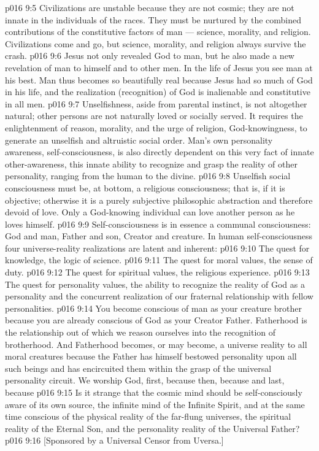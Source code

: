 \vs p016 9:5 Civilizations are unstable because they are not cosmic; they are not innate in the individuals of the races. They must be nurtured by the combined contributions of the constitutive factors of man --- science, morality, and religion. Civilizations come and go, but science, morality, and religion always survive the crash.
\vs p016 9:6 Jesus not only revealed God to man, but he also made a new revelation of man to himself and to other men. In the life of Jesus you see man at his best. Man thus becomes so beautifully real because Jesus had so much of God in his life, and the realization (recognition) of God is inalienable and constitutive in all men.
\vs p016 9:7 \pc Unselfishness, aside from parental instinct, is not altogether natural; other persons are not naturally loved or socially served. It requires the enlightenment of reason, morality, and the urge of religion, God\hyp{}knowingness, to generate an unselfish and altruistic social order. Man’s own personality awareness, self\hyp{}consciousness, is also directly dependent on this very fact of innate other\hyp{}awareness, this innate ability to recognize and grasp the reality of other personality, ranging from the human to the divine.
\vs p016 9:8 Unselfish social consciousness must be, at bottom, a religious consciousness; that is, if it is objective; otherwise it is a purely subjective philosophic abstraction and therefore devoid of love. Only a God\hyp{}knowing individual can love another person as he loves himself.
\vs p016 9:9 Self\hyp{}consciousness is in essence a communal consciousness: God and man, Father and son, Creator and creature. In human self\hyp{}consciousness four universe\hyp{}reality realizations are latent and inherent:
\vs p016 9:10 \bibnobreakspace The quest for knowledge, the logic of science.
\vs p016 9:11 \bibnobreakspace The quest for moral values, the sense of duty.
\vs p016 9:12 \bibnobreakspace The quest for spiritual values, the religious experience.
\vs p016 9:13 \bibnobreakspace The quest for personality values, the ability to recognize the reality of God as a personality and the concurrent realization of our fraternal relationship with fellow personalities.
\vs p016 9:14 \pc You become conscious of man as your creature brother because you are already conscious of God as your Creator Father. Fatherhood is the relationship out of which we reason ourselves into the recognition of brotherhood. And Fatherhood becomes, or may become, a universe reality to all moral creatures because the Father has himself bestowed personality upon all such beings and has encircuited them within the grasp of the universal personality circuit. We worship God, first, because  then, because  and last, because 
\vs p016 9:15 Is it strange that the cosmic mind should be self\hyp{}consciously aware of its own source, the infinite mind of the Infinite Spirit, and at the same time conscious of the physical reality of the far\hyp{}flung universes, the spiritual reality of the Eternal Son, and the personality reality of the Universal Father?
\vsetoff
\vs p016 9:16 [Sponsored by a Universal Censor from Uversa.]
